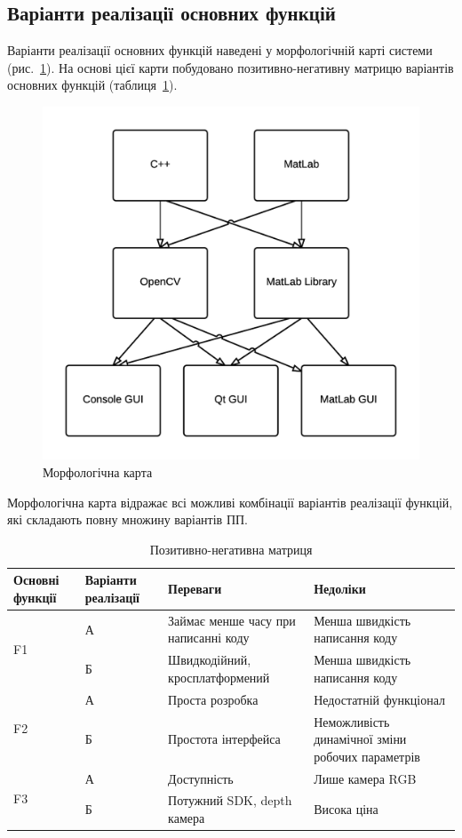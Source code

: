 \subsection{Варіанти реалізації основних функцій}
Варіанти реалізації основних функцій наведені у морфологічній карті системи (рис.~\ref{fig:economics_morph}). На основі цієї карти побудовано позитивно-негативну матрицю варіантів основних функцій (таблиця~\ref{tab:economics_positive_negative_matrix}). 

\begin{figure}
	\centering
	\includegraphics[width=0.7\linewidth]{economics/img/map}
	\caption{Морфологічна карта}
	\label{fig:economics_morph}
\end{figure}


Морфологічна карта відражає всі можливі комбінації варіантів реалізації функцій, які складають повну множину варіантів ПП.

\begin{table}[]
	\caption{Позитивно-негативна матриця}
	\centering
\begin{tabular}{|p{}|p{}|p{}|p{}|}\hline
	Основні функції & Варіанти реалізації & Переваги &  Недоліки \\ 
\hline
\multirow{2}{*}{F1}	& А &  Займає менше часу при написанні коду
					& Менша швидкість написання коду \\ 
	 \cline{2-4} 
					& Б & Швидкодійний, кросплатформений
				    & Менша швидкість написання коду\\
\hline
\multirow{2}{*}{F2} & А & Проста розробка 
					& Недостатній функціонал\\ 
	\cline{2-4}         
					& Б & Простота інтерфейса 
					& Неможливість динамічної зміни робочих параметрів \\
\hline
\multirow{2}{*}{F3} & А & Доступність 
					& Лише камера RGB \\
	\cline{2-4}
					& Б & Потужний SDK, depth камера
					& Висока ціна  \\
\hline
	\end{tabular}
	\label{tab:economics_positive_negative_matrix}
\end{table}

